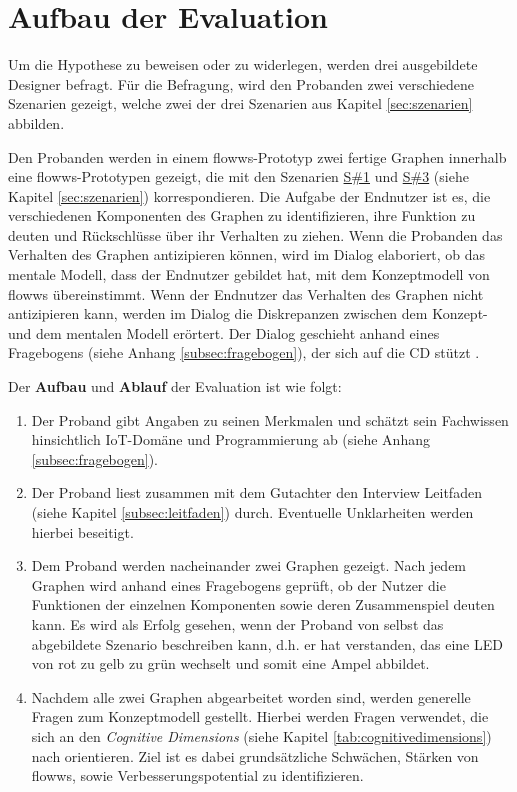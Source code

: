 \section{Aufbau der Evaluation}
Um die Hypothese zu beweisen oder zu widerlegen, werden drei ausgebildete Designer befragt. Für die Befragung, wird den Probanden zwei verschiedene Szenarien gezeigt, welche zwei der drei Szenarien aus Kapitel \ref{sec:szenarien} abbilden.

Den Probanden werden in einem flowws-Prototyp zwei fertige Graphen innerhalb eine flowws-Prototypen gezeigt, die mit den Szenarien \hyperref[szenario1]{S\#1} und  \hyperref[szenario3]{S\#3} (siehe Kapitel \ref{sec:szenarien}) korrespondieren. Die Aufgabe der Endnutzer ist es, die verschiedenen Komponenten des Graphen zu identifizieren, ihre Funktion zu deuten und Rückschlüsse über ihr Verhalten zu ziehen. Wenn die Probanden das Verhalten des Graphen antizipieren können, wird im Dialog elaboriert, ob das mentale Modell, dass der Endnutzer gebildet hat, mit dem Konzeptmodell von flowws übereinstimmt. Wenn der Endnutzer das Verhalten des Graphen nicht antizipieren kann, werden im Dialog die Diskrepanzen zwischen dem Konzept- und dem mentalen Modell erörtert. Der Dialog geschieht anhand eines Fragebogens (siehe Anhang \ref{subsec:fragebogen}), der sich auf die \ac{CD} stützt \cite{blackwell2000cognitive}.

Der \textbf{Aufbau} und \textbf{Ablauf} der Evaluation ist wie folgt:
\begin{enumerate}
    \item Der Proband gibt Angaben zu seinen Merkmalen und schätzt sein Fachwissen hinsichtlich \ac{IoT}-Domäne und Programmierung ab (siehe Anhang \ref{subsec:fragebogen}).
    \item Der Proband liest zusammen mit dem Gutachter den Interview Leitfaden (siehe Kapitel \ref{subsec:leitfaden}) durch. Eventuelle Unklarheiten werden hierbei beseitigt. 
    \item Dem Proband werden nacheinander zwei Graphen gezeigt. Nach jedem Graphen wird anhand eines Fragebogens geprüft, ob der Nutzer die Funktionen der einzelnen Komponenten sowie deren Zusammenspiel deuten kann. Es wird als Erfolg gesehen, wenn der Proband von selbst das abgebildete Szenario beschreiben kann, d.h. er hat verstanden, das eine LED von rot zu gelb zu grün wechselt und somit eine Ampel abbildet. 
    \item Nachdem alle zwei Graphen abgearbeitet worden sind, werden generelle Fragen zum Konzeptmodell gestellt. Hierbei werden Fragen verwendet, die sich an den \textit{Cognitive Dimensions} (siehe Kapitel \ref{tab:cognitivedimensions}) nach \cite{blackwell2000cognitive} orientieren. Ziel ist es dabei grundsätzliche Schwächen, Stärken von flowws, sowie Verbesserungspotential zu identifizieren.
\end{enumerate}

